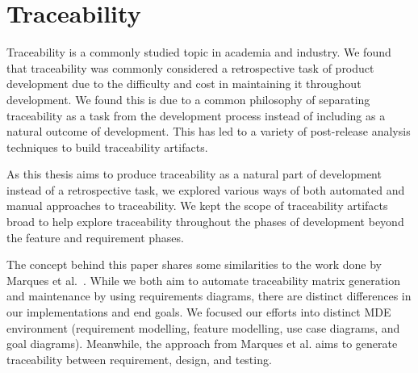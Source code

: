 

\section{Traceability}

Traceability is a commonly studied topic in academia and industry. We found that traceability was commonly considered a retrospective task of product development due to the difficulty and cost in maintaining it throughout development. We found this is due to a common philosophy of separating traceability as a task from the development process instead of including as a natural outcome of development. This has led to a variety of post-release analysis techniques to build traceability artifacts.

As this thesis aims to produce traceability as a natural part of development instead of a retrospective task, we explored various ways of both automated and manual approaches to traceability. We kept the scope of traceability artifacts broad to help explore traceability throughout the phases of development beyond the feature and requirement phases.



The concept behind this paper shares some similarities to the work done by Marques et al.~\cite{6945504}. While we both aim to automate traceability matrix generation and maintenance by using requirements diagrams, there are distinct differences in our implementations and end goals. We focused our efforts into distinct \ac{MDE} environment (requirement modelling, feature modelling, use case diagrams, and goal diagrams). Meanwhile, the approach from Marques et al. aims to generate traceability between requirement, design, and testing.

